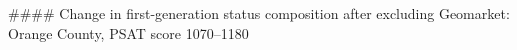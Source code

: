 #### Change in first-generation status composition after excluding Geomarket: Orange County, PSAT score 1070–1180
